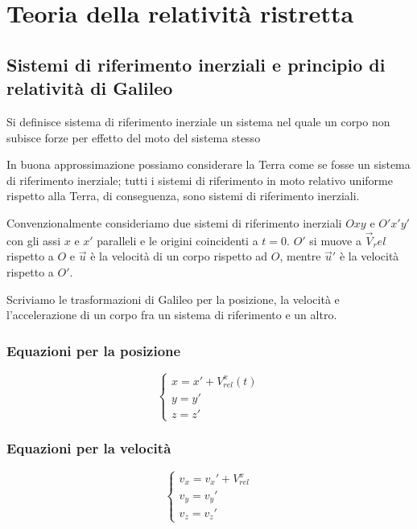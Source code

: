 \section{Teoria della relatività ristretta}
    \subsection{Sistemi di riferimento inerziali e principio di relatività di Galileo}
        \par Si definisce sistema di riferimento inerziale un sistema nel quale un corpo non subisce forze per effetto del moto del sistema stesso
        \par In buona approssimazione possiamo considerare la Terra come se fosse un sistema di riferimento inerziale; tutti i sistemi di riferimento in moto relativo uniforme rispetto alla Terra, di conseguenza, sono sistemi di riferimento inerziali.
        \par Convenzionalmente consideriamo due sistemi di riferimento inerziali $Oxy$ e $O'x'y'$ con gli assi $x$ e $x'$ paralleli e le origini coincidenti a $t=0$. $O'$ si muove a $\vec{V}_rel$ rispetto a $O$ e $\vec{u}$ è la velocità di un corpo rispetto ad $O$, mentre $\vec{u}'$ è la velocità rispetto a $O'$.
        \par Scriviamo le trasformazioni di Galileo per la posizione, la velocità e l'accelerazione di un corpo fra un sistema di riferimento e un altro.
        \subsubsection{Equazioni per la posizione}
        \begin{equation}
            \begin{cases}
            x = x' + V_{rel}^x(t)\\
            y = y'\\
            z = z'
            \end{cases}
        \end{equation}
        \subsubsection{Equazioni per la velocità}
        \begin{equation}
            \begin{cases}
            v_x = v_x' + V_{rel}^x\\
            v_y = v_y'\\
            v_z = v_z'
            \end{cases}
        \end{equation}

